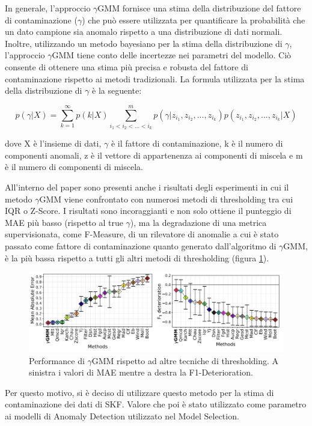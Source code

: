In generale, l'approccio $\gamma$GMM fornisce una stima della distribuzione del fattore di contaminazione ($\gamma$) che può essere utilizzata per quantificare la probabilità che un dato campione sia anomalo rispetto a una distribuzione di dati normali. Inoltre, utilizzando un metodo bayesiano per la stima della distribuzione di $\gamma$, l'approccio $\gamma$GMM tiene conto delle incertezze nei parametri del modello. Ciò consente di ottenere una stima più precisa e robusta del fattore di contaminazione rispetto ai metodi tradizionali.
La formula utilizzata per la stima della distribuzione di $\gamma$ è la seguente:

\[p(\gamma | X) = \sum_{k=1}^{\infty} p(k | X) \sum_{i_1 < i_2 <...< i_k}^{m} p(\gamma | z_{i_1}, z_{i_2},..., z_{i_k}) p(z_{i_1}, z_{i_2},..., z_{i_k} | X)\]

dove X è l'insieme di dati, $\gamma$ è il fattore di contaminazione, k è il numero di componenti anomali, z è il vettore di appartenenza ai componenti di miscela e m è il numero di componenti di miscela.

All'interno del paper sono presenti anche i risultati degli esperimenti in cui il metodo $\gamma$GMM viene confrontato con numerosi metodi di thresholding tra cui IQR o Z-Score. I risultati sono incoraggianti e non solo ottiene il punteggio di MAE più basso (rispetto al true $\gamma$), ma la degradazione di una metrica supervisionata, come F-Measure, di un rilevatore di anomalie a cui è stato passato come fattore di contaminazione quanto generato dall'algoritmo di $\gamma$GMM, è la più bassa rispetto a tutti gli altri metodi di thresholding (figura \ref{ygmm2}). 

\begin{figure}[t]
	\centering
	\includegraphics[width=14cm, scale=1]{images/ygmm2}
	\caption{Performance di $\gamma$GMM rispetto ad altre tecniche di thresholding. A sinistra i valori di MAE mentre a destra la F1-Deterioration.}
	\label{ygmm2}
\end{figure}

Per questo motivo, si è deciso di utilizzare questo metodo per la stima di contaminazione dei dati di SKF. Valore che poi è stato utilizzato come parametro ai modelli di Anomaly Detection utilizzato nel Model Selection.
